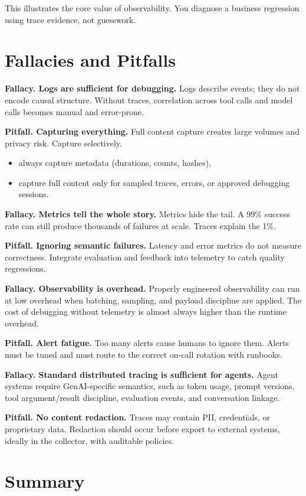 This illustrates the core value of observability. You diagnose a business regression using trace evidence, not guesswork.

\section{Fallacies and Pitfalls}

\textbf{Fallacy. Logs are sufficient for debugging.} Logs describe events; they do not encode causal structure. Without traces, correlation across tool calls and model calls becomes manual and error-prone.

\textbf{Pitfall. Capturing everything.} Full content capture creates large volumes and privacy risk. Capture selectively.
\begin{itemize}
\item always capture metadata (durations, counts, hashes),
\item capture full content only for sampled traces, errors, or approved debugging sessions.
\end{itemize}

\textbf{Fallacy. Metrics tell the whole story.} Metrics hide the tail. A 99\% success rate can still produce thousands of failures at scale. Traces explain the 1\%.

\textbf{Pitfall. Ignoring semantic failures.} Latency and error metrics do not measure correctness. Integrate evaluation and feedback into telemetry to catch quality regressions.

\textbf{Fallacy. Observability is overhead.} Properly engineered observability can run at low overhead when batching, sampling, and payload discipline are applied. The cost of debugging without telemetry is almost always higher than the runtime overhead.

\textbf{Pitfall. Alert fatigue.} Too many alerts cause humans to ignore them. Alerts must be tuned and must route to the correct on-call rotation with runbooks.

\textbf{Fallacy. Standard distributed tracing is sufficient for agents.} Agent systems require GenAI-specific semantics, such as token usage, prompt versions, tool argument/result discipline, evaluation events, and conversation linkage.

\textbf{Pitfall. No content redaction.} Traces may contain PII, credentials, or proprietary data. Redaction should occur before export to external systems, ideally in the collector, with auditable policies.

\section{Summary}

